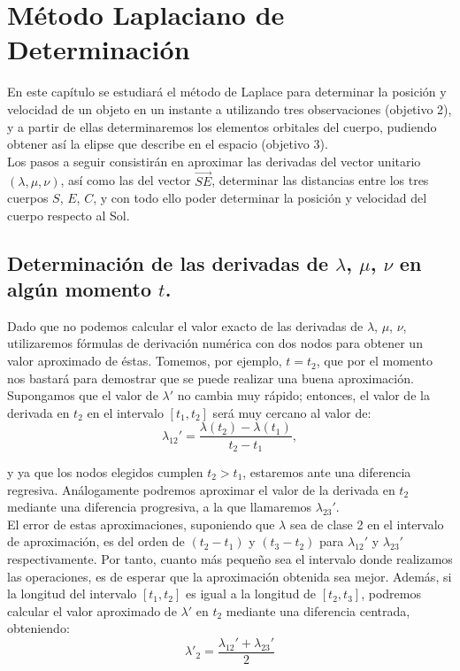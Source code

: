 \chapter{Método Laplaciano de Determinación}
\label{chap:laplace_method}
En este capítulo se estudiará el método de Laplace para determinar la posición y velocidad de un objeto en un instante a utilizando tres observaciones (objetivo 2), y a partir de ellas determinaremos los elementos orbitales del cuerpo, pudiendo obtener así la elipse que describe en el espacio (objetivo 3).\\

Los pasos a seguir consistirán en aproximar las derivadas del vector unitario $(\lambda,\mu,\nu)$, así como las del vector $\overrightarrow{SE}$, determinar las distancias entre los tres cuerpos $S$, $E$, $C$, y con todo ello poder determinar la posición y velocidad del cuerpo respecto al Sol.\\

\section{Determinación de las derivadas de $\lambda$, $\mu$, $\nu$ en algún momento $t$.}
\label{sec:primera_segunda_derivada}
Dado que no podemos calcular el valor exacto de las derivadas de $\lambda$, $\mu$, $\nu$, utilizaremos fórmulas de derivación numérica con dos nodos para obtener un valor aproximado de éstas. Tomemos, por ejemplo, $t=t_2$, que por el momento nos bastará para demostrar que se puede realizar una buena aproximación. Supongamos que el valor de $\lambda'$ no cambia muy rápido; entonces, el valor de la derivada en $t_2$ en el intervalo $[t_1,t_2]$ será muy cercano al valor de:
\[
\lambda_{12}'=\frac{\lambda(t_2)-\lambda(t_1)}{t_2-t_1},
\]

\noindent y ya que los nodos elegidos cumplen $t_2>t_1$, estaremos ante una diferencia regresiva. Análogamente podremos aproximar el valor de la derivada en $t_2$ mediante una diferencia progresiva, a la que llamaremos $\lambda_{23}'$.\\

El error de estas aproximaciones, suponiendo que $\lambda$ sea de clase 2 en el intervalo de aproximación, es del orden de $(t_2-t_1)$ y $(t_3-t_2)$ para $\lambda_{12}'$ y $\lambda_{23}'$ respectivamente. Por tanto, cuanto más pequeño sea el intervalo donde realizamos las operaciones, es de esperar que la aproximación obtenida sea mejor. Además, si la longitud del intervalo $[t_1,t_2]$ es igual a la longitud de $[t_2,t_3]$, podremos calcular el valor aproximado de $\lambda'$ en $t_2$ mediante una diferencia centrada, obteniendo:
\[
\lambda'_2=\frac{\lambda_{12}'+\lambda_{23}'}{2}
\]

